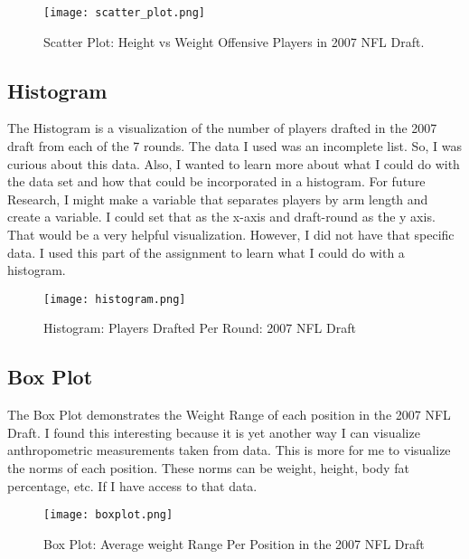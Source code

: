 \documentclass{article}
\begin{document}
\begin{figure}[h]
\centering
\texttt{[image: scatter\_plot.png]}
\caption{\label{scatter_plot.png}Scatter Plot: Height vs Weight Offensive Players in 2007 NFL Draft.}
\end{figure}

\subsection{Histogram}

The Histogram is a visualization of the number of players drafted in the 2007 draft from each of the 7 rounds.  The data I used was an incomplete list. So, I was curious about this data.  Also, I wanted to learn more about what I could do with the data set and how that could be incorporated in a histogram. For future Research, I might make a variable that separates players by arm length and create a variable. I could set that as the x-axis and draft-round as the y axis.  That would be a very helpful visualization.  However, I did not have that specific data.  I used this part of the assignment to learn what I could do with a histogram.     

\begin{figure}[h]
\centering
\texttt{[image: histogram.png]}
\caption{\label{histogram.png}Histogram: Players Drafted Per Round:  2007 NFL Draft}
\end{figure}


\subsection{Box Plot}

The Box Plot demonstrates the Weight Range of each position in the 2007 NFL Draft. I found this interesting because it is yet another way I can visualize anthropometric measurements taken from data.  This is more for me to visualize the norms of each position.  These norms can be weight, height, body fat percentage, etc. If I have access to that data.     

\begin{figure}[h]
\centering
\texttt{[image: boxplot.png]}
\caption{\label{boxplot.png}Box Plot: Average weight Range Per Position in the 2007 NFL Draft}
\end{figure}
\end{document}

